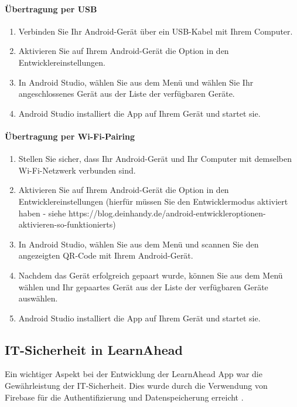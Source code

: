 \paragraph{Übertragung per USB}
\begin{enumerate}
    \item Verbinden Sie Ihr Android-Gerät über ein USB-Kabel mit Ihrem Computer.
    \item Aktivieren Sie auf Ihrem Android-Gerät die Option  in den Entwicklereinstellungen.
    \item In Android Studio, wählen Sie  aus dem  Menü und wählen Sie Ihr angeschlossenes Gerät aus der Liste der verfügbaren Geräte.
    \item Android Studio installiert die App auf Ihrem Gerät und startet sie.
\end{enumerate}

\paragraph{Übertragung per Wi-Fi-Pairing}
\begin{enumerate}
    \item Stellen Sie sicher, dass Ihr Android-Gerät und Ihr Computer mit demselben Wi-Fi-Netzwerk verbunden sind.
    \item Aktivieren Sie auf Ihrem Android-Gerät die Option  in den Entwicklereinstellungen (hierfür müssen Sie den Entwicklermodus aktiviert haben - siehe https://blog.deinhandy.de/android-entwickleroptionen-aktivieren-so-funktionierts)
    \item In Android Studio, wählen Sie  aus dem  Menü und scannen Sie den angezeigten QR-Code mit Ihrem Android-Gerät.
    \item Nachdem das Gerät erfolgreich gepaart wurde, können Sie  aus dem  Menü wählen und Ihr gepaartes Gerät aus der Liste der verfügbaren Geräte auswählen.
    \item Android Studio installiert die App auf Ihrem Gerät und startet sie.
\end{enumerate}

\subsection{IT-Sicherheit in LearnAhead}
Ein wichtiger Aspekt bei der Entwicklung der LearnAhead App war die Gewährleistung der IT-Sicherheit. Dies wurde durch die Verwendung von Firebase für die Authentifizierung und Datenspeicherung erreicht \cite{firebase_overview}.\newline
